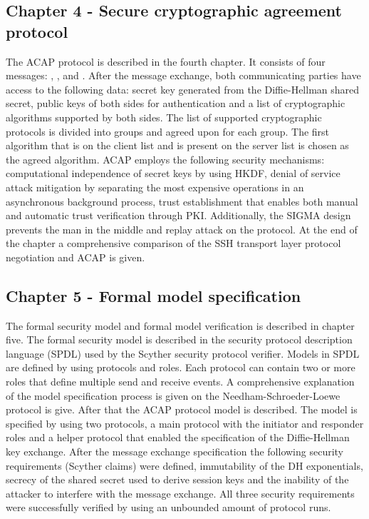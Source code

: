 \subsection*{Chapter 4 - Secure cryptographic agreement protocol}

The ACAP protocol is described in the fourth chapter. It consists of four
messages: \initi{}, \initr{}, \listi{} and \listr{}. After the message
exchange,
both communicating parties have access to the following data: secret key
generated from the Diffie-Hellman shared secret, public keys of both sides for
authentication and a list of cryptographic algorithms supported by both sides.
The list of supported cryptographic protocols is divided into groups and agreed
upon for each group. The first algorithm that is on the client list and is
present on the server list is chosen as the agreed algorithm. ACAP employs the
following security mechanisms: computational independence of secret keys by
using HKDF, denial of service attack mitigation by separating the most expensive
operations in an asynchronous background process, trust establishment that
enables both manual and automatic trust verification through PKI. Additionally,
the SIGMA design prevents the man in the middle and replay attack on the
protocol. At the end of the chapter a comprehensive comparison of the SSH
transport layer protocol negotiation and ACAP is given.

\subsection*{Chapter 5 - Formal model specification}

The formal security model and formal model verification is described in chapter
five. The formal security model is described in the security protocol
description language (SPDL) used by the Scyther security protocol verifier.
Models in SPDL are defined by using protocols and roles. Each protocol can
contain two or more roles that define multiple send and receive events. A
comprehensive explanation of the model specification process is given on the
Needham-Schroeder-Loewe protocol is give. After that the ACAP protocol model is
described. The model is specified by using two protocols, a main protocol with
the initiator and responder roles and a helper protocol that enabled the
specification of the Diffie-Hellman key exchange. After the message exchange
specification the following security requirements (Scyther claims) were defined,
immutability of the DH exponentials, secrecy of the shared secret used to derive
session keys and the inability of the attacker to interfere with the message
exchange. All three security requirements were successfully verified by using an
unbounded amount of protocol runs.

